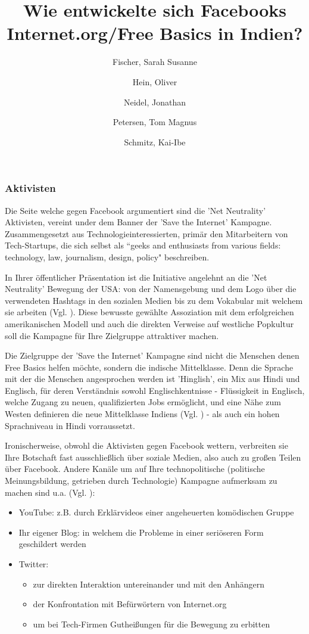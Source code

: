 \documentclass{article}
\title{Wie entwickelte sich Facebooks Internet.org/Free Basics in Indien?}
\author{
  Fischer, Sarah Susanne\\
  \and
  Hein, Oliver\\
  \and
  Neidel, Jonathan\\
  \and
  Petersen, Tom Magnus\\
  \and
  Schmitz, Kai-Ibe\\
}
\begin{document}
\maketitle

\subsubsection{Aktivisten}


Die Seite welche gegen Facebook argumentiert sind die 'Net Neutrality' Aktivisten, vereint under dem Banner der 'Save the Internet' Kampagne.
Zusammengesetzt aus Technologieinteressierten, primär den Mitarbeitern von Tech-Startups, die sich selbst als ``geeks and enthusiasts from various fields: technology, law, journalism, design, policy" \cite{sti2015} beschreiben.



In Ihrer öffentlicher Präsentation ist die Initiative angelehnt an die 'Net Neutrality' Bewegung der USA: von der Namensgebung und dem Logo über die verwendeten Hashtags in den sozialen Medien bis zu dem Vokabular mit welchem sie arbeiten (Vgl. \cite{prasad2017}). Diese bewusste gewählte Assoziation mit dem erfolgreichen amerikanischen Modell und auch die direkten Verweise auf westliche Popkultur soll die Kampagne für Ihre Zielgruppe attraktiver machen.

Die Zielgruppe der 'Save the Internet' Kampagne sind nicht die Menschen denen Free Basics helfen möchte, sondern die indische Mittelklasse. Denn die Sprache mit der die Menschen angesprochen werden ist 'Hinglish', ein Mix aus Hindi und Englisch, für deren Verständnis sowohl Englischkentnisse - Flüssigkeit in Englisch, welche Zugang zu neuen, qualifizierten Jobs ermöglicht, und eine Nähe zum Westen definieren die neue Mittelklasse Indiens (Vgl. \cite{fernandes2006}) - als auch ein hohen Sprachniveau in Hindi vorraussetzt.

Ironischerweise, obwohl die Aktivisten gegen Facebook wettern, verbreiten sie Ihre Botschaft fast ausschließlich über soziale Medien, also auch zu großen Teilen über Facebook. Andere Kanäle um auf Ihre technopolitische (politische Meinungsbildung, getrieben durch Technologie) Kampagne aufmerksam zu machen sind u.a. (Vgl. \cite{prasad2017}):
\begin{itemize}
  \item YouTube: z.B. durch Erklärvideos einer angeheuerten komödischen Gruppe
  \item Ihr eigener Blog: in welchem die Probleme in einer seriöseren Form geschildert werden
  \item Twitter:
    \begin{itemize}
      \item zur direkten Interaktion untereinander und mit den Anhängern
      \item der Konfrontation mit Befürwörtern von Internet.org
      \item um bei Tech-Firmen Gutheißungen für die Bewegung zu erbitten
    \end{itemize}
\end{itemize}

\end{document}
